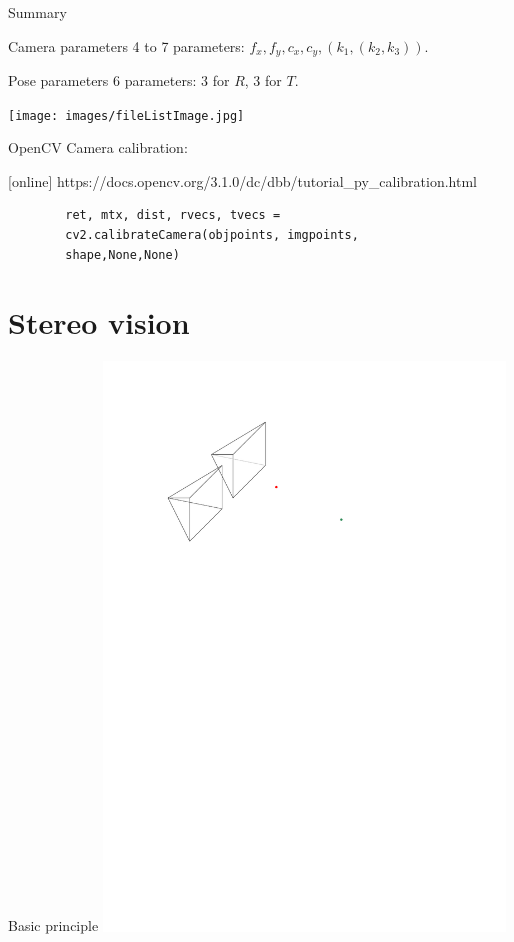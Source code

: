 \documentclass[aspectratio=169]{beamer}
\begin{document}
\begin{frame}{Summary}
    \begin{block}{Camera parameters}
        4 to 7 parameters: $f_x, f_y, c_x, c_y, (k_1, (k_2, k_3))$.
    \end{block}
    \begin{block}{Pose parameters}
        6 parameters: 3 for $R$, 3 for $T$.
    \end{block}
    \centering
    \texttt{[image: images/fileListImage.jpg]}
\end{frame}
\begin{frame}[fragile]{OpenCV}
    Camera calibration:
    \begin{thebibliography}{9}
        [online]
        \small https://docs.opencv.org/3.1.0/dc/dbb/tutorial\_py\_calibration.html
    \end{thebibliography}
    \begin{verbatim}
        ret, mtx, dist, rvecs, tvecs =
        cv2.calibrateCamera(objpoints, imgpoints,
        shape,None,None)
    \end{verbatim}
\end{frame}
\section{Stereo vision}
\begin{frame}
    \tableofcontents[sectionstyle=show/shaded]
\end{frame}
\begin{frame}{Basic principle}
    \includegraphics[width=0.8\textwidth]{images/stereo.pdf}
\end{frame}
\end{document}
